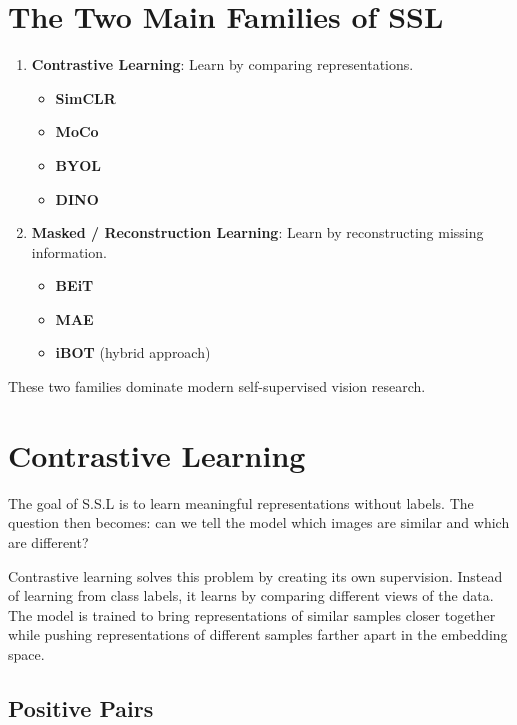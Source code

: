 \section{The Two Main Families of SSL}

\begin{enumerate}[label=\Roman*)]
    \item \textbf{Contrastive Learning}: Learn by comparing representations.
    \begin{itemize}
        \item \textbf{SimCLR}
        \item \textbf{MoCo}
        \item \textbf{BYOL}
        \item \textbf{DINO}
    \end{itemize}
    
    \item \textbf{Masked / Reconstruction Learning}: Learn by reconstructing missing information.
    \begin{itemize}
        \item \textbf{BEiT}
        \item \textbf{MAE}
        \item \textbf{iBOT} (hybrid approach)
    \end{itemize}
\end{enumerate}

These two families dominate modern self-supervised vision research.

\section{Contrastive Learning}

The goal of S.S.L is to learn meaningful representations without labels. The question then becomes: can we tell the model which images are similar and which are different?

Contrastive learning solves this problem by creating its own supervision. Instead of learning from class labels, it learns by comparing different views of the data. The model is trained to bring representations of similar samples closer together while pushing representations of different samples farther apart in the embedding space.

\subsection{Positive Pairs}


